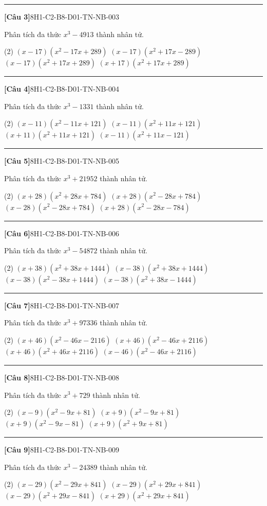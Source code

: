 \documentclass[12pt,a4paper]{article}
\newif\ifloigiai
\newenvironment{cauhoi}[2]{%
  \par\medskip\noindent\rule{\textwidth}{0.4pt}\par\nopagebreak
  \noindent\textbf{[#1]}\hfill{\scriptsize\ttfamily #2}\par\nopagebreak\smallskip}{\par}
\newcommand{\dapan}[1]{\ifloigiai\par\smallskip\noindent\textit{Đáp án:} \textbf{#1}\par\fi}
\begin{document}
\begin{cauhoi}{Câu 3}{8H1-C2-B8-D01-TN-NB-003}
Phân tích đa thức $x^{3}-4913$ thành nhân tử.
\begin{tasks}(2)
\task $(x-17)(x^{2}-17x+289)$
\task $(x-17)(x^{2}+17x-289)$
\task $(x-17)(x^{2}+17x+289)$
\task $(x+17)(x^{2}+17x+289)$
\end{tasks}
\dapan{C}
\end{cauhoi}
\begin{cauhoi}{Câu 4}{8H1-C2-B8-D01-TN-NB-004}
Phân tích đa thức $x^{3}-1331$ thành nhân tử.
\begin{tasks}(2)
\task $(x-11)(x^{2}-11x+121)$
\task $(x-11)(x^{2}+11x+121)$
\task $(x+11)(x^{2}+11x+121)$
\task $(x-11)(x^{2}+11x-121)$
\end{tasks}
\dapan{B}
\end{cauhoi}
\begin{cauhoi}{Câu 5}{8H1-C2-B8-D01-TN-NB-005}
Phân tích đa thức $x^{3}+21952$ thành nhân tử.
\begin{tasks}(2)
\task $(x+28)(x^{2}+28x+784)$
\task $(x+28)(x^{2}-28x+784)$
\task $(x-28)(x^{2}-28x+784)$
\task $(x+28)(x^{2}-28x-784)$
\end{tasks}
\dapan{B}
\end{cauhoi}
\begin{cauhoi}{Câu 6}{8H1-C2-B8-D01-TN-NB-006}
Phân tích đa thức $x^{3}-54872$ thành nhân tử.
\begin{tasks}(2)
\task $(x+38)(x^{2}+38x+1444)$
\task $(x-38)(x^{2}+38x+1444)$
\task $(x-38)(x^{2}-38x+1444)$
\task $(x-38)(x^{2}+38x-1444)$
\end{tasks}
\dapan{B}
\end{cauhoi}
\begin{cauhoi}{Câu 7}{8H1-C2-B8-D01-TN-NB-007}
Phân tích đa thức $x^{3}+97336$ thành nhân tử.
\begin{tasks}(2)
\task $(x+46)(x^{2}-46x-2116)$
\task $(x+46)(x^{2}-46x+2116)$
\task $(x+46)(x^{2}+46x+2116)$
\task $(x-46)(x^{2}-46x+2116)$
\end{tasks}
\dapan{B}
\end{cauhoi}
\begin{cauhoi}{Câu 8}{8H1-C2-B8-D01-TN-NB-008}
Phân tích đa thức $x^{3}+729$ thành nhân tử.
\begin{tasks}(2)
\task $(x-9)(x^{2}-9x+81)$
\task $(x+9)(x^{2}-9x+81)$
\task $(x+9)(x^{2}-9x-81)$
\task $(x+9)(x^{2}+9x+81)$
\end{tasks}
\dapan{B}
\end{cauhoi}
\begin{cauhoi}{Câu 9}{8H1-C2-B8-D01-TN-NB-009}
Phân tích đa thức $x^{3}-24389$ thành nhân tử.
\begin{tasks}(2)
\task $(x-29)(x^{2}-29x+841)$
\task $(x-29)(x^{2}+29x+841)$
\task $(x-29)(x^{2}+29x-841)$
\task $(x+29)(x^{2}+29x+841)$
\end{tasks}
\dapan{B}
\end{cauhoi}
\end{document}
